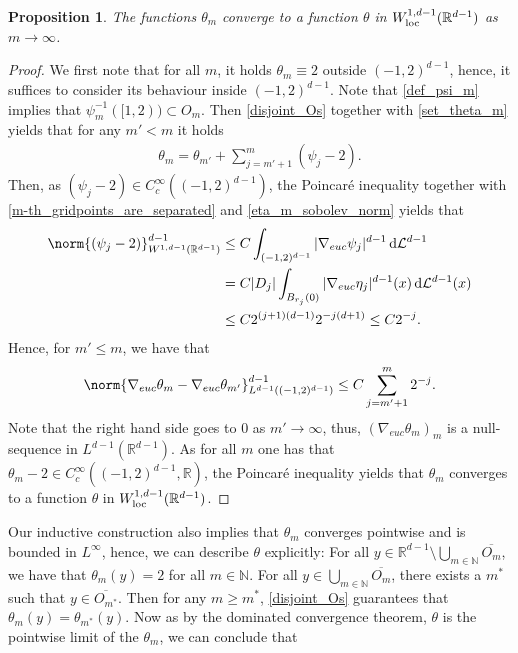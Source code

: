 \documentclass[a4paper,10pt]{article}
\newtheorem{proposition}[theorem]{Proposition}
\numberwithin{equation}{section}
\newcommand{\R}{\mathbb{R}}
\newcommand{\N}{\mathbb{N}}
\newcommand{\di}{{\rm d}}
\begin{document}
\begin{proposition}
    The functions $\theta_m$ converge to a function $\theta$ in $W^{1,d-1}_{\rm loc}(\R^{d-1})$ as $m \to \infty$.
\end{proposition}
\begin{proof}
    We first note that for all $m$, it holds $\theta_m \equiv 2$ outside $(-1, 2)^{d-1}$, hence, it suffices to consider its behaviour inside $(-1, 2)^{d-1}$. Note that \eqref{def_psi_m} implies that $\psi_m^{-1}([1, 2)) \subset O_m$. Then \eqref{disjoint_Os} together with \eqref{set_theta_m} yields that for any $m' < m$ it holds 
    \begin{align}\label{explicit_theta_for_cauchy_sequence}
        \theta_m = \theta_{m'} + \sum_{j=m'+1}^{m} (\psi_j-2).
    \end{align}
    Then, as $(\psi_j-2) \in C_c^\infty((-1,2)^{d-1})$, the Poincaré inequality together with \eqref{m-th_gridpoints_are_separated} and \ref{eta_m_sobolev_norm} yields that 
    \begin{align}
        \norm{(\psi_j-2)}^{d-1}_{W^{1,d-1}(\R^{d-1})} &\leq C \int_{(-1, 2)^{d-1}}|\nabla_{euc}\psi_j|^{d-1}\, \di \mathcal{L}^{d-1} \nonumber \\
        &= C|D_j| \int_{B_{r_j}(0)} |\nabla_{euc}\eta_j|^{d-1}(x) \, \di \mathcal{L}^{d-1}(x) \nonumber \\
        & \leq C2^{(j+1)(d-1)}2^{-j(d+1)} \leq C2^{-j} \label{sobolev_estimate_psi_j}.
    \end{align}
    Hence, for $m' \leq m$, we have that 
    \begin{align*}
        \norm{\nabla_{euc}\theta_m -\nabla_{euc}\theta_{m'}}_{L^{d-1}((-1, 2)^{d-1})}^{d-1} \leq C\sum_{j=m'+1}^{m} 2^{-j}.
    \end{align*}
    Note that the right hand side goes to $0$ as $m' \to \infty$, thus, $(\nabla_{euc}\theta_m)_m$ is a null-sequence in $L^{d-1}(\R^{d-1})$. As for all $m$ one has that $\theta_m-2\in C_c^\infty((-1, 2)^{d-1}, \R)$, the Poincaré inequality yields that $\theta_m$ converges to a function $\theta$ in $W^{1,d-1}_{\rm loc}(\R^{d-1})$. 
\end{proof}
Our inductive construction also implies that $\theta_m$ converges pointwise and is bounded in $L^\infty$, hence, we can describe $\theta$ explicitly:
For all $y \in \R^{d-1}\setminus \bigcup_{m \in \N} \overline{O_m}$, we have that $\theta_m(y)=2$ for all $m \in \N$. For all $y \in \bigcup_{m \in \N} \overline{O_m}$, there exists a $m^*$ such that $y \in \overline{O_{m^*}}$. Then for any $m \geq m^*$, \eqref{disjoint_Os} guarantees that $\theta_m(y) = \theta_{m^*}(y)$. Now as by the dominated convergence theorem, $\theta$ is the pointwise limit of the $\theta_m$, we can conclude that
\end{document}
